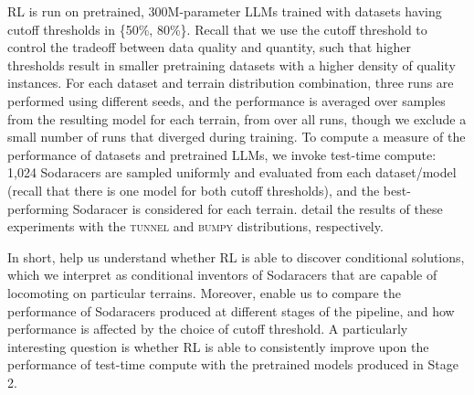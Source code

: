 \documentclass{article}
\begin{document}
RL is run on pretrained, 300M-parameter LLMs trained with datasets having cutoff thresholds in \{50\%, 80\%\}. Recall that we use the cutoff threshold to control the tradeoff between data quality and quantity, such that higher thresholds result in smaller pretraining datasets with a higher density of quality instances. For each dataset and terrain distribution combination, three runs are performed using different seeds, and the performance is averaged over samples from the resulting model for each terrain, from over all runs, though we exclude a small number of runs that diverged during training. To compute a measure of the performance of datasets and pretrained LLMs, we invoke test-time compute: 1{,}024 Sodaracers are sampled uniformly and evaluated from each dataset/model (recall that there is one model for both cutoff thresholds), and the best-performing Sodaracer is considered for each terrain.  detail the results of these experiments with the \textsc{tunnel} and \textsc{bumpy} distributions, respectively.

In short,  help us understand whether RL is able to discover conditional solutions, which we interpret as conditional inventors of Sodaracers that are capable of locomoting on particular terrains. Moreover,  enable us to compare the performance of Sodaracers produced at different stages of the pipeline, and how performance is affected by the choice of cutoff threshold. A particularly interesting question is whether RL is able to consistently improve upon the performance of test-time compute with the pretrained models produced in Stage 2. %
\end{document}
